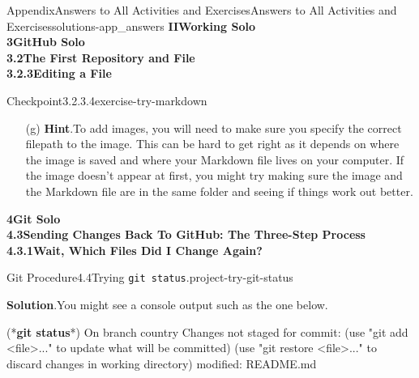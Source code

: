 \documentclass[twoside,10pt,]{book}
\newcommand{\blocktitlefont}{\relax}
\newcommand{\mono}[1]{\texttt{#1}}
\newcommand{\consoleinput}[1]{\textbf{#1}}
\begin{document}
\begin{solutions-chapter}{Appendix}{Answers to All Activities and Exercises}{}{Answers to All Activities and Exercises}{}{}{solutions-app_answers}
\noindent\textbf{\Large{}II\space\textperiodcentered\space{}Working Solo\\
3\space\textperiodcentered\space{}GitHub Solo\\
3.2\space\textperiodcentered\space{}The First Repository and File\\
3.2.3\space\textperiodcentered\space{}Editing a File}
\begin{inlinesolution}{Checkpoint}{3.2.3.4}{}{exercise-try-markdown}%
\begin{enumerate}[font=\bfseries,label=(\alph*),ref=\alph*]%
\item[(g)]\noindent\textbf{\blocktitlefont Hint}.\hypertarget{hint-try-markdown-i-b-back}{}\quad{}To add images, you will need to make sure you specify the correct filepath to the image. This can be hard to get right as it depends on where the image is saved and where your Markdown file lives on your computer. If the image doesn't appear at first, you might try making sure the image and the Markdown file are in the same folder and seeing if things work out better.%
\end{enumerate}%
\end{inlinesolution}%
\par\medskip
\noindent\textbf{\Large{}4\space\textperiodcentered\space{}Git Solo\\
4.3\space\textperiodcentered\space{}Sending Changes Back To GitHub: The Three-Step Process\\
4.3.1\space\textperiodcentered\space{}Wait, Which Files Did I Change Again?}
\begin{projectsolution}{Git Procedure}{4.4}{Trying \mono{git status}.}{project-try-git-status}%
\par\smallskip%
\noindent\textbf{\blocktitlefont Solution}.\hypertarget{solution-try-git-status-e-back}{}\quad{}You might see a console output such as the one below.%
\begin{console}{0}{1}{0}
(*\consoleinput{git status}*)
On branch country
Changes not staged for commit:
  (use "git add <file>..." to update what will be committed)
  (use "git restore <file>..." to discard changes in working directory)
        modified:   README.md


\end{console}
\end{projectsolution}
\end{solutions-chapter}
\end{document}
